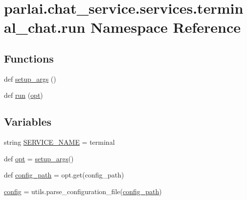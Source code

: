 \hypertarget{namespaceparlai_1_1chat__service_1_1services_1_1terminal__chat_1_1run}{}\section{parlai.\+chat\+\_\+service.\+services.\+terminal\+\_\+chat.\+run Namespace Reference}
\label{namespaceparlai_1_1chat__service_1_1services_1_1terminal__chat_1_1run}
\subsection*{Functions}
\begin{DoxyCompactItemize}
\item 
def \hyperlink{namespaceparlai_1_1chat__service_1_1services_1_1terminal__chat_1_1run_a644a131d95fe6a2053b91eddd022fbf6}{setup\+\_\+args} ()
\item 
def \hyperlink{namespaceparlai_1_1chat__service_1_1services_1_1terminal__chat_1_1run_a2d090fbaf981ed8221ad1a1e5be061ea}{run} (\hyperlink{namespaceparlai_1_1chat__service_1_1services_1_1terminal__chat_1_1run_adf4dc01fedda1351bb784c41bc2b21cc}{opt})
\end{DoxyCompactItemize}
\subsection*{Variables}
\begin{DoxyCompactItemize}
\item 
string \hyperlink{namespaceparlai_1_1chat__service_1_1services_1_1terminal__chat_1_1run_a29cff218e4a1bce1a042cb80e19a3393}{S\+E\+R\+V\+I\+C\+E\+\_\+\+N\+A\+ME} = \textquotesingle{}terminal\textquotesingle{}
\item 
def \hyperlink{namespaceparlai_1_1chat__service_1_1services_1_1terminal__chat_1_1run_adf4dc01fedda1351bb784c41bc2b21cc}{opt} = \hyperlink{namespaceparlai_1_1chat__service_1_1services_1_1terminal__chat_1_1run_a644a131d95fe6a2053b91eddd022fbf6}{setup\+\_\+args}()
\item 
def \hyperlink{namespaceparlai_1_1chat__service_1_1services_1_1terminal__chat_1_1run_a83bae75084643003977f413daca860a6}{config\+\_\+path} = opt.\+get(\textquotesingle{}config\+\_\+path\textquotesingle{})
\item 
\hyperlink{namespaceparlai_1_1chat__service_1_1services_1_1terminal__chat_1_1run_a4361047d588ccc6be7146ba6a063cd9f}{config} = utils.\+parse\+\_\+configuration\+\_\+file(\hyperlink{namespaceparlai_1_1chat__service_1_1services_1_1terminal__chat_1_1run_a83bae75084643003977f413daca860a6}{config\+\_\+path})
\end{DoxyCompactItemize}


